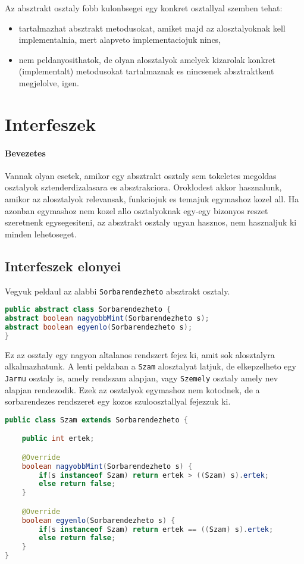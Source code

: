 \documentclass{article}
\let\l\lstinline
\begin{document}
Az absztrakt osztaly fobb kulonbsegei egy konkret osztallyal szemben tehat:
\begin{itemize}
    \item tartalmazhat absztrakt metodusokat, amiket majd az alosztalyoknak kell implementalnia, mert alapveto implementaciojuk nincs,
    \item nem peldanyosithatok, de olyan alosztalyok amelyek kizarolak konkret (implementalt) metodusokat tartalmaznak es nincsenek absztraktkent megjelolve, igen.
\end{itemize}

\newpage

\section{Interfeszek}

\paragraph{Bevezetes} Vannak olyan esetek, amikor egy absztrakt osztaly sem tokeletes megoldas osztalyok sztenderdizalasara es absztrakciora. Oroklodest akkor hasznalunk, amikor az alosztalyok relevansak, funkciojuk es temajuk egymashoz kozel all. Ha azonban egymashoz nem kozel allo osztalyoknak egy-egy bizonyos reszet szeretnenk egysegesiteni, az absztrakt osztaly ugyan hasznos, nem hasznaljuk ki minden lehetoseget.

\subsection{Interfeszek elonyei}

Vegyuk peldaul az alabbi \l{Sorbarendezheto} absztrakt osztaly.

\begin{lstlisting}[language=Java, caption=Sorbarendezheto osztaly]
public abstract class Sorbarendezheto {
abstract boolean nagyobbMint(Sorbarendezheto s);
abstract boolean egyenlo(Sorbarendezheto s);
}
\end{lstlisting}

Ez az osztaly egy nagyon altalanos rendszert fejez ki, amit sok alosztalyra alkalmazhatunk. A lenti peldaban a \l{Szam} alosztalyat latjuk, de elkepzelheto egy \l{Jarmu} osztaly is, amely rendszam alapjan, vagy \l{Szemely} osztaly amely nev alapjan rendezodik. Ezek az osztalyok egymashoz nem kotodnek, de a sorbarendezes rendszeret egy kozos szuloosztallyal fejezzuk ki.

\begin{lstlisting}[language=Java, caption=Sorbarendezheto osztaly]
public class Szam extends Sorbarendezheto {

	public int ertek;

	@Override
	boolean nagyobbMint(Sorbarendezheto s) {
		if(s instanceof Szam) return ertek > ((Szam) s).ertek;
		else return false;
	}

	@Override
	boolean egyenlo(Sorbarendezheto s) {
		if(s instanceof Szam) return ertek == ((Szam) s).ertek;
		else return false;
	}
}
\end{lstlisting}
\end{document}
